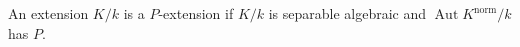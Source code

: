 An extension $K/k$ is a $P$-extension if $K/k$ is separable algebraic and $\operatorname{Aut} K^{\text{norm}}/k$ has $P$.
